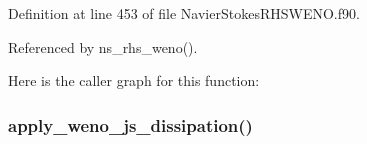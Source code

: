 Definition at line 453 of file Navier\+Stokes\+R\+H\+S\+W\+E\+N\+O.\+f90.



Referenced by ns\+\_\+rhs\+\_\+weno().

Here is the caller graph for this function\+:
\hypertarget{namespacenavierstokesrhsweno_a4a196ab534e2977d20c69a739e0e3eae}{}\label{namespacenavierstokesrhsweno_a4a196ab534e2977d20c69a739e0e3eae} 
\subsubsection{\texorpdfstring{apply\+\_\+weno\+\_\+js\+\_\+dissipation()}{apply\_weno\_js\_dissipation()}}
